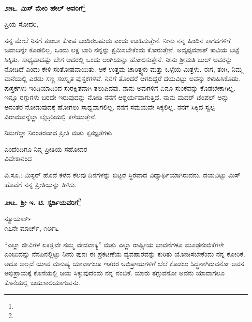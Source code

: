 \begin{center}
\textbf{೨೫೬. ಮಿಸ್ ಮೇರಿ ಹೇಲ್‌ ಅವರಿಗೆ}\footnote{}
\end{center}

\vspace{-0.3cm}

ಪ್ರಿಯ ಸೋದರಿ,

ನನ್ನ ಮೇಲೆ ನಿನಗೆ ತುಂಬಾ ಕೋಪ ಬಂದಿರಬಹುದು ಎಂದು ಊಹಿಸುತ್ತೇನೆ. ನೀನು ನನ್ನ ಹಿಂದಿನ ಕಾಗದಗಳಿಗೆ ಜವಾಬನ್ನೇ ಕೊಡಲಿಲ್ಲ. ಒಂದು ಲಕ್ಷ ಬಾರಿ ನನ್ನನ್ನು ಕ್ಷಮಿಸಬೇಕೆಂದು ಕೋರುತ್ತೇನೆ. ಅದೃಷ್ಟವಶಾತ್‌ ಕಾವಿಯ ಬಟ್ಟೆ ಸಿಕ್ಕಿತು. ಸಾಧ್ಯವಾದಷ್ಟು ಬೇಗ ಅದರಲ್ಲಿ ಒಂದು ಅಂಗಿಯನ್ನು ಹೋಲಿಸುತ್ತೇನೆ. ನೀನು ಶ‍್ರೀಮತಿ ಬುಲ್ ಅವರನ್ನು ನೋಡಿದೆ ಎಂದು ಕೇಳಿ ಸಂತೋಷವಾಯಿತು. ಆಕೆ ಉತ್ತಮ ಚಾರಿತ್ರ್ಯಳು ಮತ್ತು ಒಳ್ಳೆಯ ಮಿತ್ರಳು. ಈಗ, ತಂಗಿ, ನಿಮ್ಮ ಮನೆಯಲ್ಲಿ ಎರಡು ಸಣ್ಣ ಸಂಸ್ಕೃತ ಪುಸ್ತಕಗಳಿವೆ. ನಿನಗೆ ತೊಂದರೆ ಆಗದಿದ್ದರೆ ದಯವಿಟ್ಟು ಅವನ್ನು ಕಳುಹಿಸಿಕೊಡು. ಪುಸ್ತಕಗಳು ಇಂಡಿಯಾದಿಂದ ಸುರಕ್ಷಿತವಾಗಿ ತಲುಪಿದವು. ನಾನು ಅವುಗಳಿಗೆ ಏನೂ ಸುಂಕವನ್ನು ಕೊಡಬೇಕಾಗಿಲ್ಲ. ಇನ್ನೂ ರಗ್ಗುಗಳು ಬರದೇ ಇರುವುದನ್ನು ನೋಡಿ ನನಗೆ ಆಶ್ಚರ್ಯವಾಗುತ್ತಿದೆ. ನಾನು ಮದರ್ ಟೆಂಪಲ್ ಅನ್ನು ಅನಂತರ ನೋಡುವುದಕ್ಕೆ ಹೋಗಲು ಸಾಧ್ಯವಾಗಲಿಲ್ಲ. ನನಗೆ ಸಮಯವೇ ಸಿಕ್ಕಲಿಲ್ಲ. ನನಗೆ ಸಿಕ್ಕಿದ ಸ್ವಲ್ಪ ವಿರಾಮವನ್ನೆಲ್ಲಾ ಲೈಬ್ರರಿಯಲ್ಲಿ ಕಳೆಯುತ್ತೇನೆ.

ನಿಮಗೆಲ್ಲಾ ನಿರಂತರವಾದ ಪ್ರೀತಿ ಮತ್ತು ಕೃತಜ್ಞತೆಗಳು.

\vspace{-0.3cm}

\begin{flushright}
ಎಂದೆಂದಿಗೂ ನಿನ್ನ ಪ್ರೀತಿಯ ಸಹೋದರ\\ವಿವೇಕಾನಂದ
\end{flushright}

ವಿ.ಸೂ.: ಮಿಸ್ಟರ್ ಹೊವೆ ಕಳೆದ ಕೆಲವು ದಿನಗಳನ್ನು ಬಿಟ್ಟರೆ ಸ್ಥಿರವಾದ ವಿದ್ಯಾರ್ಥಿಯಾಗಿರುವನು. ದಯವಿಟ್ಟು ಮಿಸ್ ಹೊವೆಗೆ ನನ್ನ ಪ್ರೀತಿಯನ್ನು ತಿಳಿಸು.

\begin{center}
\textbf{೨೫೭. ಶ‍್ರೀ ಇ. ಟಿ. ಸ್ಟರ್ಡಿಯವರಿಗೆ}\footnote{}
\end{center}

\vspace{-0.55cm}

\begin{flushright}
ನ್ಯೂಯಾರ್ಕ್\\೧೭ನೇ ಮಾರ್ಚ್, ೧೮೯೬
\end{flushright}

“ಎಲ್ಲಾ ಜೀವಿಗಳ ಏಕತ್ವವೇ ನಮ್ಮ ವೇದವಾಕ್ಯ” ಮತ್ತು ಎಲ್ಲಾ ರಾಷ್ಟ್ರೀಯ ಭಾವನೆಗಳೂ ಮೂಢನಂಬಿಕೆಗಳೇ ಎಂಬುದನ್ನು ನೆನಪಿನಲ್ಲಿಟ್ಟು ನೀನು ಪುನಃ ಈ ಪ್ರಕಟಣೆಯ ವ್ಯವಹಾರವನ್ನು ಕುರಿತು ಯೋಚಿಸಬೇಕೆಂದು ನನ್ನ ಕೋರಿಕೆ. ಅದೂ ಅಲ್ಲದೆ ಯಾವ ಮನುಷ್ಯ ಯಾವಾಗಲೂ ಇತರರ ಅಭಿಪ್ರಾಯಗಳಿಗೆ ಬೆಲೆ ಕೊಡಲು ಸಿದ್ಧನಾಗಿರುವನೋ ಅವನ ಅಭಿಪ್ರಾಯಕ್ಕೆ ಕೊನೆಯಲ್ಲಿ ಜಯ ಸಿಕ್ಕುವುದೆಂದು ನನ್ನ ನಂಬಿಕೆ. ಯಾರು ತಗ್ಗುವನೋ ಅವನು ಯಾವಾಗಲೂ ಕೊನೆಯಲ್ಲಿ ಜಯಶಾಲಿಯಾಗುವನು.

